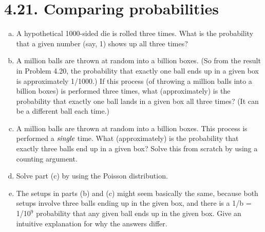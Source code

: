 \section*{4.21. Comparing probabilities}
\begin{enumerate}[(a)]
    \item A hypothetical 1000-sided die is rolled three times. What is the probability
        that a given number (say, 1) shows up all three times?

    \item A million balls are thrown at random into a billion boxes. (So from 
        the result in Problem 4.20, the probability that exactly 
        one ball ends up in a given box is approximately 1/1000.)
        If this process (of throwing a million balls into a billion
        boxes) is performed three times, what (approximately) is the probability
        that exactly one ball lands in a given box all three times?
        (It can be a different ball each time.)

    \item A million balls are thrown at random into a billion boxes. This process
        is performed a $\emph{single}$ time. What (approximately) is the 
        probability that exactly three balls end up in a given box?
        Solve this from scratch by using a counting argument.

    \item Solve part (c) by using the Poisson distribution.

    \item The setups in parts (b) and (c) might seem basically the same,
        because both setups involve three balls ending up in the given
        box, and there is a 1/b = 1/10$^9$ probability that any given ball
        ends up in the given box. Give an intuitive explanation
        for why the answers differ.
\end{enumerate}

\vspace{1em}

